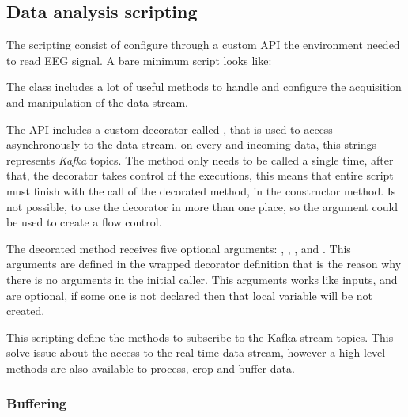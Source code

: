 \subsection{Data analysis scripting}\label{ch4:data_analysis}


The scripting consist of configure through a custom API the environment needed to read EEG signal. A bare minimum script looks like:



The  class includes a lot of useful methods to handle and configure the acquisition and manipulation of the data stream.

The API includes a custom decorator called , that is used to access asynchronously to the data stream. on every  and  incoming data, this strings represents \textit{Kafka} topics. The  method only needs to be called a single time, after that, the decorator takes control of the executions, this means that entire script must finish with the call of the decorated method, in the constructor method. Is not possible, to use the decorator  in more than one place, so the argument  could be used to create a flow control.



The decorated method receives five optional arguments: , , ,  and . This arguments are defined in the wrapped decorator definition that is the reason why there is no arguments in the initial caller. This arguments works like inputs, and are optional, if some one is not declared then that local variable will be not created.





This scripting define the methods to subscribe to the Kafka stream topics. This solve issue about the access to the real-time data stream, however a high-level methods are also available to process, crop and buffer data.

\subsubsection{Buffering}

